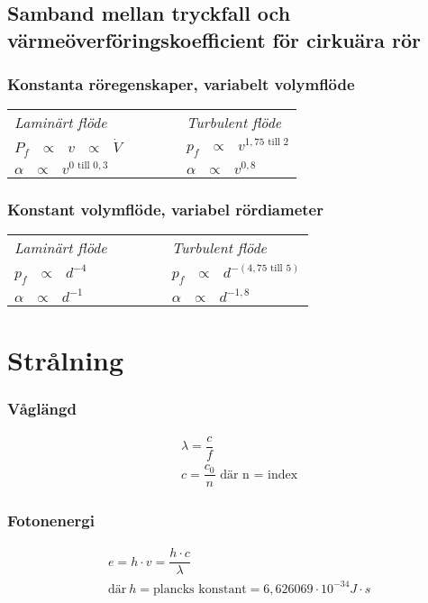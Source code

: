   \subsection*{Samband mellan tryckfall och värmeöverföringskoefficient för cirkuära rör}
\subsubsection*{Konstanta röregenskaper, variabelt volymflöde}
\begin{tabularx}{\linewidth} { l l l}
	\textit{Laminärt flöde} & ~~~~~  & \textit{Turbulent flöde} \\ 
  $P_f \text{ } \propto \text{ } v \text{ } \propto \text{ } \dot{V}$ &&  $p_f \text{ } \propto \text{ } v^{1,75 \text{ till } 2}$\\
  $\alpha \text{ } \propto \text{ } v^{0 \text{ till } 0,3}$ &&  $\alpha \text{ } \propto \text{ } v^{0,8}$\\
	\end{tabularx}
\subsubsection*{Konstant volymflöde, variabel rördiameter}
\begin{tabularx}{\linewidth} {l l l} 
	\textit{Laminärt flöde} & ~~~~~  & \textit{Turbulent flöde} \\ 
	$p_f \text{ } \propto \text{ } d^{-4}$ && $p_f \text{ } \propto \text{ } d^{-(4,75 \text{ till } 5)}$\\
	$\alpha \text{ } \propto \text{ } d^{-1}$ && $\alpha \text{ } \propto \text{ } d^{-1,8}$\\
	\end{tabularx}
\section*{Strålning}
\subsubsection*{Våglängd}
\begin{align*}
	&\lambda = \dfrac{c}{f} \\
	& c = \dfrac{c_{0}}{n} \text{ där n = index}
\end{align*}
\subsubsection*{Fotonenergi}
\begin{align*}
	& e = h \cdot v = \dfrac{h \cdot c}{\lambda}\\
	& \text{där} \ h = \text{plancks konstant} = 6,626069 \cdot 10^{-34} J \cdot s
\end{align*}
